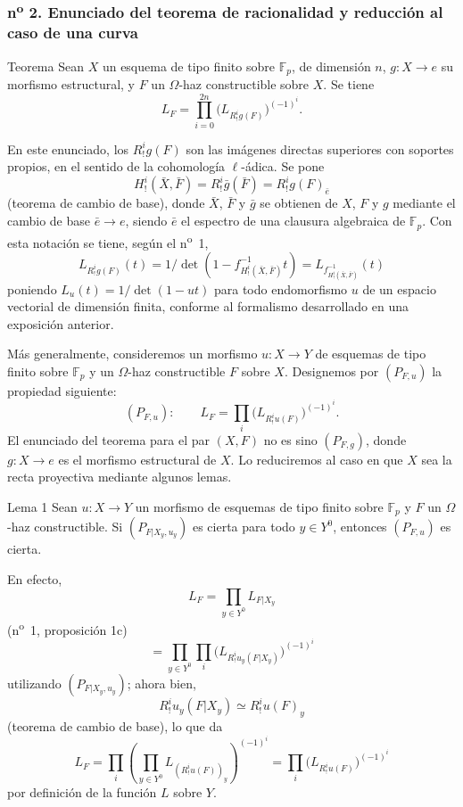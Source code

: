 \subsubsection*{n\textsuperscript{o} 2. Enunciado del teorema de racionalidad y reducción al caso de una curva}

\begin{statement}{Teorema}
Sean $X$ un esquema de tipo finito sobre $\mathbb F_p$, de dimensión $n$, $g:X\to e$ su morfismo estructural, y $F$ un $\Omega$-haz constructible sobre $X$. Se tiene
\[
L_F=\prod_{i=0}^{2n}\bigl(L_{R^i_!g(F)}\bigr)^{(-1)^i}.
\tag{1}
\]
\end{statement}

En este enunciado, los $R^i_!g(F)$ son las imágenes directas superiores con soportes propios, en el sentido de la cohomología $\ell$-ádica. Se pone
\[
H^i_!(\bar X,\bar F)=R^i_!\bar g(\bar F)=R^i_!g(F)_{\bar e}
\]
(teorema de cambio de base), donde $\bar X$, $\bar F$ y $\bar g$ se obtienen de $X$, $F$ y $g$ mediante el cambio de base $\bar e\to e$, siendo $\bar e$ el espectro de una clausura algebraica de $\mathbb F_p$. Con esta notación se tiene, según el n\textsuperscript{o}~1,
\[
L_{R^i_!g(F)}(t)=1/\det(1-f^{-1}_{H^i_!(\bar X,\bar F)}t)
 =L_{f^{-1}_{H^i_!(\bar X,\bar F)}}(t)
\]
poniendo $L_u(t)=1/\det(1-ut)$ para todo endomorfismo $u$ de un espacio vectorial de dimensión finita, conforme al formalismo desarrollado en una exposición anterior.

Más generalmente, consideremos un morfismo $u:X\to Y$ de esquemas de tipo finito sobre $\mathbb F_p$ y un $\Omega$-haz constructible $F$ sobre $X$. Designemos por $(P_{F,u})$ la propiedad siguiente:
\[
(P_{F,u}):\qquad
L_F=\prod_i\bigl(L_{R^i_!u(F)}\bigr)^{(-1)^i}.
\]
El enunciado del teorema para el par $(X,F)$ no es sino $(P_{F,g})$, donde $g:X\to e$ es el morfismo estructural de $X$. Lo reduciremos al caso en que $X$ sea la recta proyectiva mediante algunos lemas.

\begin{statement}{Lema 1}
Sean $u:X\to Y$ un morfismo de esquemas de tipo finito sobre $\mathbb F_p$ y $F$ un $\Omega$-haz constructible. Si $(P_{F|X_y,u_y})$ es cierta para todo $y\in Y^0$, entonces $(P_{F,u})$ es cierta.
\end{statement}

En efecto,
\[
L_F=\prod_{y\in Y^0}L_{F|X_y}
\]
(n\textsuperscript{o}~1, proposición 1c)
\[
=\prod_{y\in Y^0}\prod_i\bigl(L_{R^i_!u_y(F|X_y)}\bigr)^{(-1)^i}
\]
utilizando $(P_{F|X_y,u_y})$; ahora bien,
\[
R^i_!u_y(F|X_y)\simeq R^i_!u(F)_y
\]
(teorema de cambio de base), lo que da
\[
L_F=\prod_i\left(\prod_{y\in Y^0}L_{(R^i_!u(F))_y}\right)^{(-1)^i}
=\prod_i\bigl(L_{R^i_!u(F)}\bigr)^{(-1)^i}
\]
por definición de la función $L$ sobre $Y$.
